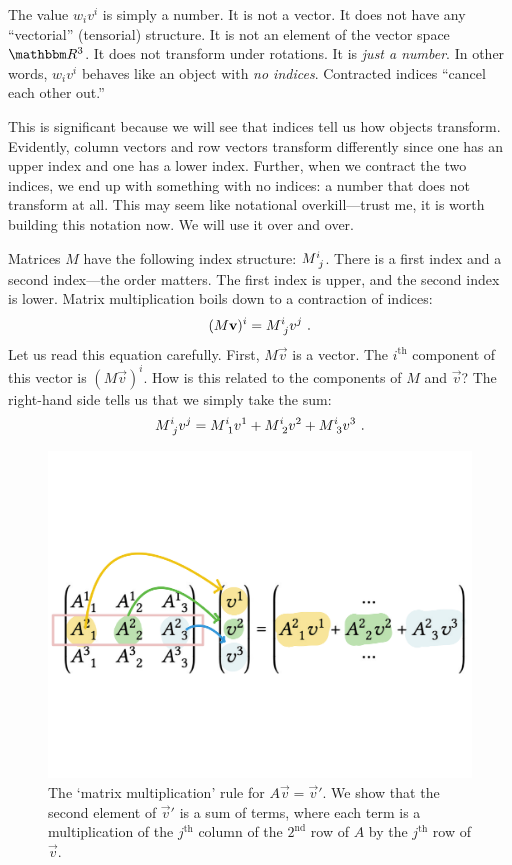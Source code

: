 \documentclass[12pt, oneside]{report}    %
\begin{document}
The value $w_iv^i$ is simply a number. It is not a vector. It does not have any ``vectorial'' (tensorial) structure. It is not an element of the vector space $\RR ^3$. It does not transform under rotations. It is \emph{just a number}. In other words, $w_iv^i$ behaves like an object with \emph{no indices}. Contracted indices ``cancel each other out.''

This is significant because we will see that indices tell us how objects transform. Evidently, column vectors and row vectors transform differently since one has an upper index and one has a lower index. Further, when we contract the two indices, we end up with something with no indices: a number that does not transform at all. This may seem like notational overkill---trust me, it is worth building this notation now. We will use it over and over.



\begin{example}
Matrices $M$ have the following index structure: $M\aij{i}{j}$. There is a first index and a second index---the order matters. The first index is upper, and the second index is lower. Matrix multiplication boils down to a contraction of indices:
\begin{align}
    (M\vec{v})^i = M\aij{i}{j}v^j \ .
    \label{eq:matrix:mult:ith:comp}
\end{align}
Let us read this equation carefully. First, $M\vec{v}$ is a vector. The $i^\text{th}$ component of this vector is $(M\vec{v})^i$. How is this related to the components of $M$ and $\vec{v}$? The right-hand side tells us that we simply take the sum:
\begin{align}
    M\aij{i}{j}v^j = 
    M\aij{i}{1}v^1 + M\aij{i}{2}v^2  + M\aij{i}{3}v^3 \ .
\end{align}
\end{example}

\begin{figure}[tb]
    \centering
    \includegraphics[width=.5\textwidth]{figures/matrixmultiplication.pdf}
    \caption{The `matrix multiplication' rule for $A\vec{v} = \vec{v}'$. We show that the second element of $\vec{v}'$ is a sum of terms, where each term is a multiplication of the $j^\text{th}$ column of the $2^\text{nd}$ row of $A$ by the $j^\text{th}$ row of $\vec{v}$.}
    \label{fig:matrix:col:mult}
\end{figure}
\end{document}
